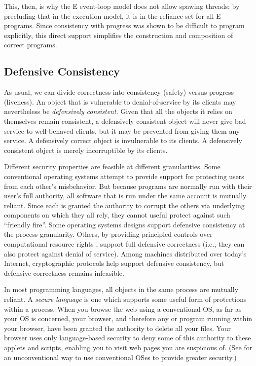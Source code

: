 \documentclass{llncs}
\begin{document}
This, then, is why the E event-loop model does not allow spawing
threads: by precluding that in the execution model, it is in the
reliance set for all E programs.  Since consistency with progress was
shown to be difficult to program explicitly, this direct support
simplifies the construction and composition of correct programs.


\subsection{Defensive Consistency}

As usual, we can divide correctness into consistency (safety) versus
progress (liveness). An object that is vulnerable to denial-of-service
by its clients may nevertheless be \emph{defensively
consistent}. Given that all the objects it relies on themselves remain
consistent, a defensively consistent object will never give bad
service to well-behaved clients, but it may be prevented from giving
them any service. A defensively correct object is invulnerable to its
clients. A defensively consistent object is merely incorruptible by
its clients.

Different security properties are feasible at different
granularities. Some conventional operating systems attempt to provide
support for protecting users from each other's misbehavior. But
because programs are normally run with their user's full authority,
all software that is run under the same account is mutually
reliant. Since each is granted the authority to corrupt the others via
underlying components on which they all rely, they cannot useful
protect against such ``friendly fire''. Some operating systems designs
\cite{dvh} support defensive consistency at the process
granularity. Others, by providing principled controls over
computational resource rights \cite{hardy:keykos,shapiro:eros},
support full defensive correctness (i.e., they can also protect
against denial of service). Among machines distributed over today's
Internet, cryptographic protocols help support defensive consistency,
but defensive correctness remains infeasible.

In most programming languages, all objects in the same process are
mutually reliant. A \emph{secure language} is one which supports some
useful form of protections within a process. When you browse the web
using a conventional OS, as far as your OS is concerned, your browser,
and therefore any  or  program running
within your browser, have been granted the authority to delete all
your files. Your browser uses only language-based security to deny
some of this authority to these applets and scripts, enabling you to
visit web pages you are suspicious of. (See \cite{stiegler:polaris} for
an unconventional way to use conventional OSes to provide greater
security.)
\end{document}
